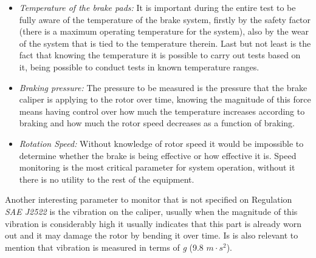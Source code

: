 			\begin{itemize}
				\item \textit{Temperature of the brake pads:} It is important during the entire test to be fully aware of the temperature of the brake system, firstly by the safety factor (there is a maximum operating temperature for the system), also by the wear of the system that is tied to the temperature therein. Last but not least is the fact that knowing the temperature it is possible to carry out tests based on it, being possible to conduct tests in known temperature ranges.
				\item \textit{Braking pressure:} The pressure to be measured is the pressure that the brake caliper is applying to the rotor over time, knowing the magnitude of this force means having control over how much the temperature increases according to braking and how much the rotor speed decreases as a function of braking.
				\item \textit{Rotation Speed:} Without knowledge of rotor speed it would be impossible to determine whether the brake is being effective or how effective it is. Speed ​​monitoring is the most critical parameter for system operation, without it there is no utility to the rest of the equipment.
			\end{itemize}

			Another interesting parameter to monitor that is not specified on Regulation \textit{SAE J2522} is the vibration on the caliper, usually when the magnitude of this vibration is considerably high it usually indicates that this part is already worn out \cite{goodyear-calipers} and it may damage the rotor by bending it over time. Is is also relevant to mention that vibration is measured in terms of \textit{g} (9.8 $m\cdot s^2$).